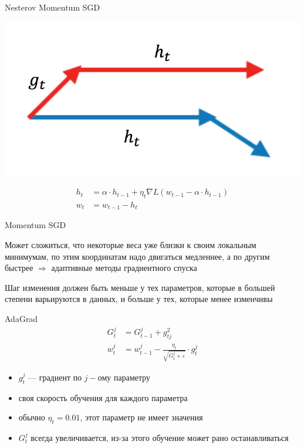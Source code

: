 \documentclass[notes,12pt, aspectratio=169]{beamer}
\newenvironment{wideitemize}{\itemize\addtolength{\itemsep}{10pt}}{\enditemize}
\begin{document}
\begin{frame}{Nesterov Momentum SGD}
\begin{center}
	\includegraphics[width=.4\linewidth]{nesterov.png}
\end{center}

\begin{equation*}
\begin{aligned}
h_t &= \alpha \cdot h_{t-1} + \eta_t \nabla L(w_{t-1} - \alpha \cdot h_{t-1}) \\
w_t &= w_{t-1} - h_t
\end{aligned}	
\end{equation*}
\end{frame}


\begin{frame}{Momentum SGD}
\begin{wideitemize}
	\item Может сложиться, что некоторые веса уже близки к своим локальным минимумам, по этим координатам надо двигаться медленнее, а по другим быстрее $\Rightarrow$ {\color{red} адаптивные методы градиентного спуска }

	\item Шаг изменения должен быть меньше у тех параметров, которые в большей степени варьируются в данных, и больше у тех, которые менее изменчивы 
\end{wideitemize}
\end{frame}


\begin{frame}{AdaGrad}
\begin{equation*}
\begin{aligned}
G_t^j &= G_{t-1}^j + g_{tj}^2 \\
w_t^j &= w_{t-1}^j - \frac{\eta_t}{\sqrt{G_t^j + \varepsilon}} \cdot g_t^j
\end{aligned}	
\end{equation*}

\begin{itemize}
	\item  $g_t^j$ — градиент по $j-$ому параметру
	\item своя скорость обучения для каждого параметра
	\item обычно $\eta_t = 0.01$, этот параметр не имеет значения
	\item $G_t^j$ всегда увеличивается, из-за этого обучение может рано останавливаться
\end{itemize}
\end{frame}
\end{document}
